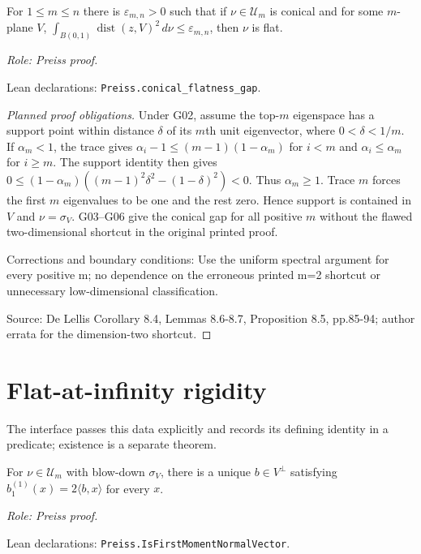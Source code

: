 \begin{theorem}
\label{thm:gap}




For $1\leq m\leq n$ there is $\varepsilon_{m,n}>0$ such that if $\nu\in\mathcal U_m$ is conical and for some $m$-plane $V$, $\int_{B(0,1)}\operatorname{dist}(z,V)^2\,d\nu\leq\varepsilon_{m,n}$, then $\nu$ is flat.
\par\emph{Role: Preiss proof.}
\par Lean declarations: \texttt{Preiss.conical\_flatness\_gap}.
\end{theorem}
\begin{proof}[Planned proof obligations]

Under G02, assume the top-$m$ eigenspace has a support point within distance
$\delta$ of its $m$th unit eigenvector, where $0<\delta<1/m$.
If $\alpha_m<1$, the trace gives
$\alpha_i-1\leq(m-1)(1-\alpha_m)$ for $i<m$ and
$\alpha_i\leq\alpha_m$ for $i\geq m$.
The support identity then gives
$0\leq(1-\alpha_m)((m-1)^2\delta^2-(1-\delta)^2)<0$.
Thus $\alpha_m\geq1$. Trace $m$ forces the first $m$ eigenvalues to be one
and the rest zero. Hence support is contained in $V$ and $\nu=\sigma_V$.
G03--G06 give the conical gap for all positive $m$ without the flawed
two-dimensional shortcut in the original printed proof.
\par Corrections and boundary conditions: Use the uniform spectral argument for every positive m; no dependence on the erroneous printed m=2 shortcut or unnecessary low-dimensional classification.
\par Source: De Lellis Corollary 8.4, Lemmas 8.6-8.7, Proposition 8.5, pp.85-94; author errata for the dimension-two shortcut.
\end{proof}

\section{Flat-at-infinity rigidity}

\begin{definition}
\label{def:rigidity-normal-vector}


The interface passes this data explicitly and records its defining identity in a predicate; existence is a separate theorem.



For $\nu\in\mathcal U_m$ with blow-down $\sigma_V$, there is a unique $b\in V^\perp$ satisfying $b_1^{(1)}(x)=2\langle b,x\rangle$ for every $x$.
\par\emph{Role: Preiss proof.}
\par Lean declarations: \texttt{Preiss.IsFirstMomentNormalVector}.
\end{definition}


